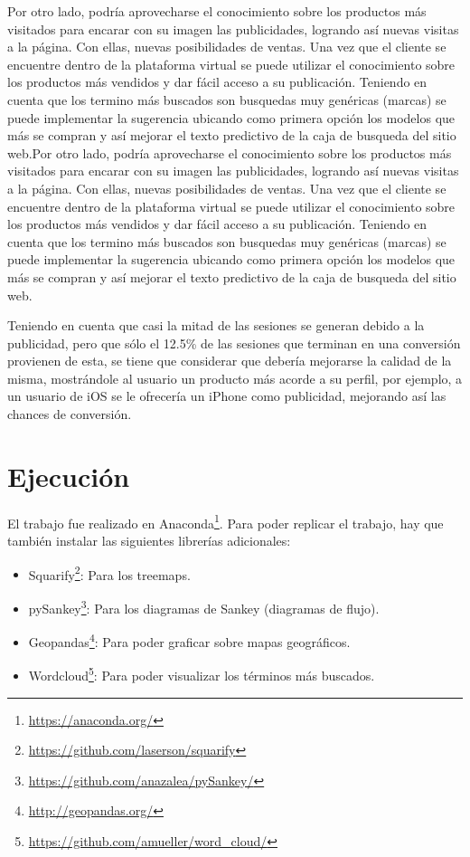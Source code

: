 \documentclass[a4paper]{article}
\begin{document}
Por otro lado, podría aprovecharse el conocimiento sobre los productos más visitados para encarar con su imagen las publicidades, logrando así nuevas visitas a la página. Con ellas, nuevas posibilidades de ventas. Una vez que el cliente se encuentre dentro de la plataforma virtual se puede utilizar el conocimiento sobre los productos más vendidos y dar fácil acceso a su publicación. Teniendo en cuenta que los termino más buscados son busquedas muy genéricas (marcas) se puede implementar la sugerencia ubicando como primera opción los modelos que más se compran y así mejorar el texto predictivo de la caja de busqueda del sitio web.Por otro lado, podría aprovecharse el conocimiento sobre los productos más visitados para encarar con su imagen las publicidades, logrando así nuevas visitas a la página. Con ellas, nuevas posibilidades de ventas. Una vez que el cliente se encuentre dentro de la plataforma virtual se puede utilizar el conocimiento sobre los productos más vendidos y dar fácil acceso a su publicación. Teniendo en cuenta que los termino más buscados son busquedas muy genéricas (marcas) se puede implementar la sugerencia ubicando como primera opción los modelos que más se compran y así mejorar el texto predictivo de la caja de busqueda del sitio web.

Teniendo en cuenta que casi la mitad de las sesiones se generan debido a la publicidad, pero que sólo el 12.5\% de las sesiones que terminan en una conversión provienen de esta, se tiene que considerar que debería mejorarse la calidad de la misma, mostrándole al usuario un producto más acorde a su perfil, por ejemplo, a un usuario de iOS se le ofrecería un iPhone como publicidad, mejorando así las chances de conversión.


\newpage
\appendix

\section{Ejecución}

El trabajo fue realizado en Anaconda\footnote{\url{https://anaconda.org/}}. Para poder replicar el trabajo, hay que también instalar las siguientes librerías adicionales:

\begin{itemize}
	\item{Squarify\footnote{\url{https://github.com/laserson/squarify}}: Para los treemaps.}
	\item{pySankey\footnote{\url{https://github.com/anazalea/pySankey/}}: Para los diagramas de Sankey (diagramas de flujo).}
	\item{Geopandas\footnote{\url{http://geopandas.org/}}: Para poder graficar sobre mapas geográficos.}
	\item{Wordcloud\footnote{\url{https://github.com/amueller/word_cloud/}}: Para poder visualizar los términos más buscados.}
\end{itemize}
\end{document}
